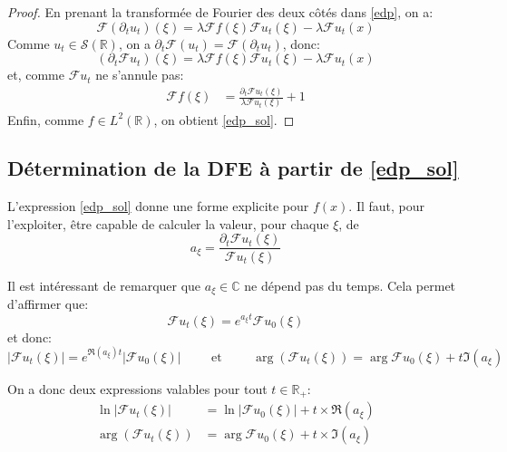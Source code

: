 \documentclass[12pt]{article}
\newcommand{\pth}[1]{\left(#1\right)}
\newcommand{\cro}[1]{\left[#1\right]}
\newcommand{\abs}[1]{\left|#1\right|}
\newcommand{\et}{\hspace{1cm}\text{et}\hspace{1cm}}
\newcommand{\ou}{\hspace{1cm}\text{ou}\hspace{1cm}}
\newcommand{\Ce}{\mathbb{C}}
\newcommand{\Er}{\mathbb{R}}
\newcommand{\Esp}[1]{\mathbb{E}\cro{#1}}
\newcommand{\dr}{\partial}
\newcommand{\fr}{\mathcal{F}}
\begin{document}
\begin{proof}
  En prenant la transformée de Fourier des deux côtés dans \eqref{edp}, on a:
\[\fr \pth{\dr_tu_t}(\xi)=\lambda \fr f(\xi)\fr {u_t}(\xi)-\lambda\fr u_t(x)\]
Comme $u_t\in \mathcal{S}(\Er)$, on a $\dr_t\fr(u_t)=\fr(\dr_tu_t)$, donc:
\[\pth{\dr_t\fr u_t}(\xi)=\lambda \fr f(\xi)\fr {u_t}(\xi)-\lambda\fr u_t(x)\]
et, comme $\fr u_t$ ne s'annule pas:
\begin{align*}
\fr f(\xi)&=\frac{\dr_t\fr u_t(\xi)}{\lambda \fr u_t(\xi)}+1
\end{align*}
Enfin, comme $f\in L^2(\Er)$, on obtient \eqref{edp_sol}.

\end{proof}


%
%
%


\subsection{Détermination de la DFE à partir de \eqref{edp_sol}\label{ss:det_dfe}}

L'expression \eqref{edp_sol} donne une forme explicite pour $f(x)$. Il faut, pour l'exploiter, être capable de calculer la valeur, pour chaque $\xi$, de
\[a_{\xi}=\frac{\dr_t\fr u_t(\xi)}{\fr u_t(\xi)}\]

Il est intéressant de remarquer que $a_{\xi}\in\Ce$ ne dépend pas du temps. Cela permet d'affirmer que:
\[\fr u_t(\xi)=e^{a_{\xi}t}\fr u_0(\xi)\] et donc:
\[\abs{\fr u_t(\xi)}=e^{\Re(a_{\xi})t}\abs{\fr u_0(\xi)} \et \arg\pth{\fr u_t(\xi)}=\arg{\fr u_0(\xi)}+t\Im(a_{\xi})\]

On a donc deux expressions valables pour tout $t\in \Er_+$:
\begin{align}
  \ln\abs{\fr u_t(\xi)}&=\ln\abs{\fr u_0(\xi)}+t\times\Re(a_{\xi})\label{re_a}\\
  \arg\pth{\fr u_t(\xi)}&=\arg{\fr u_0(\xi)}+t\times\Im(a_{\xi})\label{im_a}
\end{align}
\end{document}
